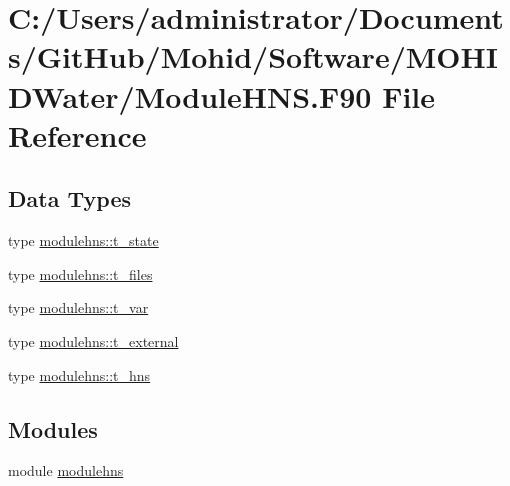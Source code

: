 \hypertarget{_module_h_n_s_8_f90}{}\section{C\+:/\+Users/administrator/\+Documents/\+Git\+Hub/\+Mohid/\+Software/\+M\+O\+H\+I\+D\+Water/\+Module\+H\+NS.F90 File Reference}
\label{_module_h_n_s_8_f90}
\subsection*{Data Types}
\begin{DoxyCompactItemize}
\item 
type \mbox{\hyperlink{structmodulehns_1_1t__state}{modulehns\+::t\+\_\+state}}
\item 
type \mbox{\hyperlink{structmodulehns_1_1t__files}{modulehns\+::t\+\_\+files}}
\item 
type \mbox{\hyperlink{structmodulehns_1_1t__var}{modulehns\+::t\+\_\+var}}
\item 
type \mbox{\hyperlink{structmodulehns_1_1t__external}{modulehns\+::t\+\_\+external}}
\item 
type \mbox{\hyperlink{structmodulehns_1_1t__hns}{modulehns\+::t\+\_\+hns}}
\end{DoxyCompactItemize}
\subsection*{Modules}
\begin{DoxyCompactItemize}
\item 
module \mbox{\hyperlink{namespacemodulehns}{modulehns}}
\end{DoxyCompactItemize}
